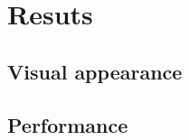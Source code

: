 

\chapter{Resuts}

\graphicspath{{results/figures/}}


\section{Visual appearance}

\section{Performance}




